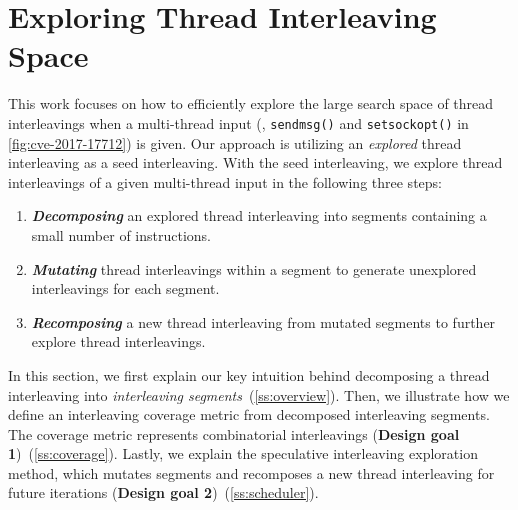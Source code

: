 \section{Exploring Thread Interleaving Space}
\label{s:design}

\newcommand{\intcov}{interleaving segment coverage\xspace}
\newcommand{\Intcov}{Interleaving segment coverage\xspace}




%

This work focuses on how to efficiently explore the large search space 
of thread interleavings when a multi-thread input
(\eg, \texttt{sendmsg()} and \texttt{setsockopt()} in
\autoref{fig:cve-2017-17712}) is given. Our approach is utilizing 
an \textit{explored} thread interleaving as a seed interleaving.
%
With the seed interleaving, we explore thread interleavings of 
a given multi-thread input in the following three steps:
%
\begin{enumerate}[labelsep=0pt, label=\textbf{\arabic*) }]
\item \textbf{\textit{Decomposing}} an explored thread interleaving
  into segments containing a small number of instructions.
\item \textbf{\textit{Mutating}} thread interleavings within a segment
  to generate unexplored interleavings for each segment. 
\item \textbf{\textit{Recomposing}} a new thread interleaving from
  mutated segments to further explore thread interleavings.
\end{enumerate}
%



In this section, we first explain our key intuition behind
decomposing a thread interleaving into \textit{interleaving
  segments}~(\autoref{ss:overview}).
%
Then, we illustrate how we define an interleaving coverage metric 
from decomposed interleaving segments.
The coverage metric represents
combinatorial interleavings (\textbf{Design goal
  1})~(\autoref{ss:coverage}).
%
Lastly, we explain the speculative interleaving exploration method,
which mutates segments and recomposes a new thread interleaving for 
future iterations (\textbf{Design goal 2})~(\autoref{ss:scheduler}).



